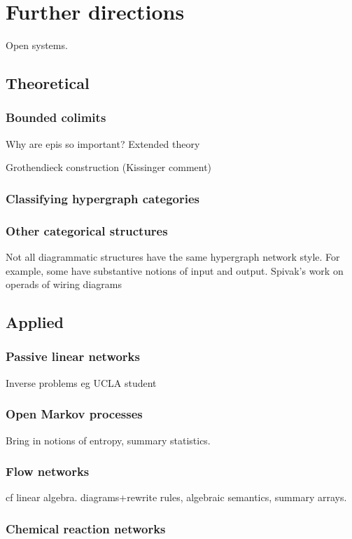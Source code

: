 \chapter{Further directions}

Open systems. 

\section{Theoretical}
\subsection{Bounded colimits}
Why are epis so important? Extended theory

Grothendieck construction (Kissinger comment)

\subsection{Classifying hypergraph categories}


\subsection{Other categorical structures}
Not all diagrammatic structures have the same hypergraph network style. For
example, some have substantive notions of input and output. Spivak's work on
operads of wiring diagrams 


\section{Applied}
\subsection{Passive linear networks}
  Inverse problems eg UCLA student 

\subsection{Open Markov processes}
Bring in notions of entropy, summary statistics. 

\subsection{Flow networks}
cf linear algebra. diagrams+rewrite rules, algebraic semantics, summary arrays.



\subsection{Chemical reaction networks}


